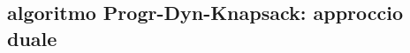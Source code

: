 
\subsection*{algoritmo Progr-Dyn-Knapsack: approccio duale}
\begin{flushleft}
\end{flushleft}


\subsection*{}
\begin{flushleft}
\end{flushleft}


\subsection*{}
\begin{flushleft}
\end{flushleft}


\subsection*{}
\begin{flushleft}
\end{flushleft}


\subsection*{}
\begin{flushleft}
\end{flushleft}


